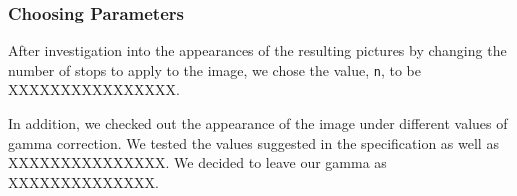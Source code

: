 \documentclass{article}
\begin{document}
\subsubsection{Choosing Parameters}
After investigation into the appearances of the resulting pictures 
by changing the number of stops to apply to the image, we chose
the value, \texttt{n}, to be XXXXXXXXXXXXXXXX. 

In addition, we checked out the appearance of the image under 
different values of gamma correction. We tested the values suggested
in the specification as well as XXXXXXXXXXXXXXX. We decided to leave
our gamma as XXXXXXXXXXXXXX.

\end{document}
